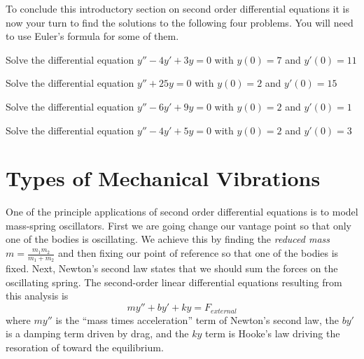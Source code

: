 To conclude this introductory section on second order differential equations it is now
your turn to find the solutions to the following four problems.  You will need to use
Euler's formula for some of them.
\begin{problem}
    Solve the differential equation $y'' - 4y' + 3y = 0$ with $y(0) = 7$ and $y'(0) = 11$
\end{problem}
\begin{problem}
    Solve the differential equation $y'' + 25 y = 0$ with $y(0) = 2$ and $y'(0) = 15$
\end{problem}
\begin{problem}
    Solve the differential equation $y''-6y'+9y=0$ with $y(0) = 2$ and $y'(0) = 1$
\end{problem}
\begin{problem}
    Solve the differential equation $y''-4y'+5y=0$ with $y(0) = 2$ and $y'(0) = 3$
\end{problem}
    




\newpage\section{Types of Mechanical Vibrations}
One of the principle applications of second order differential equations is to model
mass-spring oscillators. First we are going change our vantage point so that only one of
the bodies is oscillating.  We achieve this by finding the {\it reduced mass} $m =
\frac{m_1 m_2}{m_1 + m_2}$ and then fixing our point of reference so that one of the
bodies is fixed. Next, Newton's second law states that we should sum the forces on the
oscillating spring.  The second-order linear differential equations resulting from this
analysis is 
\[ my'' + by' + ky = F_{external} \]
where $my''$ is the ``mass times acceleration'' term of Newton's second law, the $by'$ is
a damping term driven by drag, and the $ky$ term is Hooke's law driving the resoration of
toward the equilibrium.  

